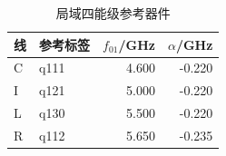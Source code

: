 \begin{table}[htbp]\centering\small
\caption{局域四能级参考器件}\label{tab:device}
\begin{tabular}{@{}llrr@{}}\toprule
线 & 参考标签 & $f_{01}$/GHz & $\alpha$/GHz\\\midrule
C & q111 & 4.600 & -0.220\\
I & q121 & 5.000 & -0.220\\
L & q130 & 5.500 & -0.220\\
R & q112 & 5.650 & -0.235\\
\bottomrule\end{tabular}\end{table}
